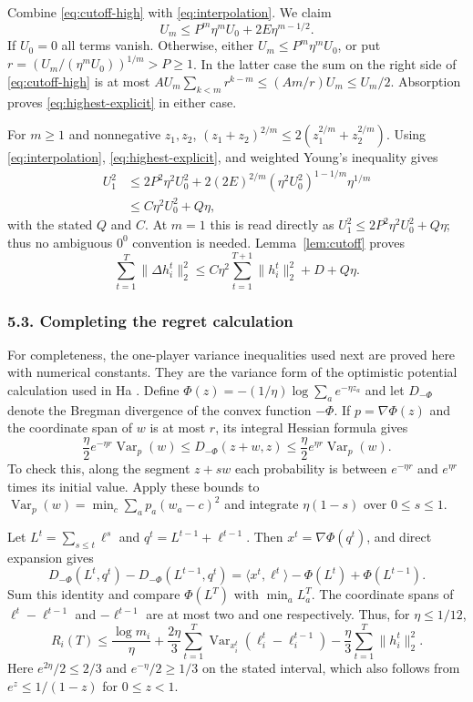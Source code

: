 \documentclass[11pt]{article}
\newcommand{\Var}{\operatorname{Var}}
\newcommand{\ip}[2]{\langle #1,#2\rangle}
\newcommand{\norm}[1]{\lVert #1\rVert}
\begin{document}
Combine \eqref{eq:cutoff-high} with \eqref{eq:interpolation}. We claim
\begin{equation}\label{eq:highest-explicit}
 U_m\leq P^m\eta^m U_0+2E\eta^{m-1/2}.
\end{equation}
If $U_0=0$ all terms vanish. Otherwise, either
$U_m\leq P^m\eta^m U_0$, or put
$r=(U_m/(\eta^mU_0))^{1/m}>P\geq1$. In the latter case the sum on the
right side of \eqref{eq:cutoff-high} is at most
$AU_m\sum_{k<m}r^{k-m}\leq(Am/r)U_m\leq U_m/2$.
Absorption proves \eqref{eq:highest-explicit} in either case.

For $m\geq1$ and nonnegative $z_1,z_2$,
$(z_1+z_2)^{2/m}\leq2(z_1^{2/m}+z_2^{2/m})$.
Using \eqref{eq:interpolation}, \eqref{eq:highest-explicit}, and weighted
Young's inequality gives
\begin{align*}
 U_1^2
 &\leq2P^2\eta^2U_0^2
       +2(2E)^{2/m}(\eta^2U_0^2)^{1-1/m}\eta^{1/m}\\
 &\leq C\eta^2U_0^2+Q\eta,
\end{align*}
with the stated $Q$ and $C$. At $m=1$ this is read directly as
$U_1^2\leq2P^2\eta^2U_0^2+Q\eta$; thus no ambiguous $0^0$
convention is needed. Lemma~\ref{lem:cutoff} proves
\begin{equation}\label{eq:temporal-explicit}
 \sum_{t=1}^T\norm{\Delta h_i^t}_2^2
 \leq C\eta^2\sum_{t=1}^{T+1}\norm{h_i^t}_2^2+D+Q\eta.
\end{equation}

\subsubsection*{5.3. Completing the regret calculation}
For completeness, the one-player variance inequalities used next are
proved here with numerical constants. They are the variance form of the
optimistic potential calculation used in Ha \cite{ha}.
Define $\Phi(z)=-(1/\eta)\log\sum_a e^{-\eta z_a}$ and let
$D_{-\Phi}$ denote the Bregman divergence of the convex function
$-\Phi$. If $p=\nabla\Phi(z)$ and the coordinate span of $w$ is at most
$r$, its integral Hessian formula gives
\[
 \frac\eta2 e^{-\eta r}\Var_p(w)
 \leq D_{-\Phi}(z+w,z)
 \leq\frac\eta2 e^{\eta r}\Var_p(w).
\]
To check this, along the segment $z+sw$ each probability is between
$e^{-\eta r}$ and $e^{\eta r}$ times its initial value. Apply these bounds
to $\Var_p(w)=\min_c\sum_a p_a(w_a-c)^2$ and integrate $\eta(1-s)$
over $0\leq s\leq1$.

Let $L^t=\sum_{s\leq t}\ell^s$ and $q^t=L^{t-1}+\ell^{t-1}$.
Then $x^t=\nabla\Phi(q^t)$, and direct expansion gives
\[
 D_{-\Phi}(L^t,q^t)-D_{-\Phi}(L^{t-1},q^t)
 =\ip{x^t}{\ell^t}-\Phi(L^t)+\Phi(L^{t-1}).
\]
Sum this identity and compare $\Phi(L^T)$ with $\min_aL_a^T$.
The coordinate spans of $\ell^t-\ell^{t-1}$ and $-\ell^{t-1}$ are at
most two and one respectively. Thus, for $\eta\leq1/12$,
\begin{equation}\label{eq:variance-rvu}
 R_i(T)\leq\frac{\log m_i}{\eta}
 +\frac{2\eta}3\sum_{t=1}^T\Var_{x_i^t}(\ell_i^t-\ell_i^{t-1})
 -\frac\eta3\sum_{t=1}^T\norm{h_i^t}_2^2.
\end{equation}
Here $e^{2\eta}/2\leq2/3$ and $e^{-\eta}/2\geq1/3$ on the stated
interval, which also follows from $e^z\leq1/(1-z)$ for $0\leq z<1$.
\end{document}
